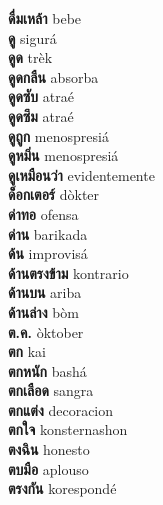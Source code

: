 \textbf{ ดื่มเหล้า  } bebe \\
\textbf{ ดู  } sigurá \\
\textbf{ ดูด  } trèk \\
\textbf{ ดูดกลืน  } absorba \\
\textbf{ ดูดซับ  } atraé \\
\textbf{ ดูดซึม  } atraé \\
\textbf{ ดูถูก  } menospresiá \\
\textbf{ ดูหมิ่น  } menospresiá \\
\textbf{ ดูเหมือนว่า  } evidentemente \\
\textbf{ ด็อกเตอร์  } dòkter \\
\textbf{ ด่าทอ  } ofensa \\
\textbf{ ด่าน  } barikada \\
\textbf{ ด้น  } improvisá \\
\textbf{ ด้านตรงข้าม  } kontrario \\
\textbf{ ด้านบน  } ariba \\
\textbf{ ด้านล่าง  } bòm \\
\textbf{ ต.ค.  } òktober \\
\textbf{ ตก  } kai \\
\textbf{ ตกหนัก  } bashá \\
\textbf{ ตกเลือด  } sangra \\
\textbf{ ตกแต่ง  } decoracion \\
\textbf{ ตกใจ  } konsternashon \\
\textbf{ ตงฉิน  } honesto \\
\textbf{ ตบมือ  } aplouso \\
\textbf{ ตรงกัน  } korespondé \\
